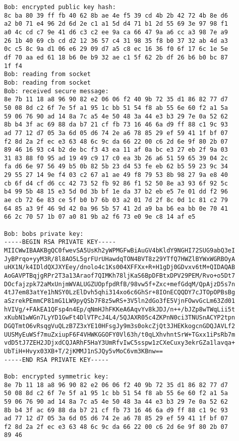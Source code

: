 \documentclass[letterpaper,12pt]{article} \usepackage{fullpage}
\begin{document}
\begin{itemize}
{\begin{verbatim}
Bob: encrypted public key hash: 
8c ba 80 39 ff fb 40 62 8b ae 4e f5 39 cd 4b 2b 42 72 4b 8e d6 
a2 b0 71 e4 96 2d 6d 2e c1 a1 5d d4 71 b1 2d 55 69 3e 97 98 f1 
a0 4c cd c7 9e 41 d6 c3 c2 ee 9a ca 66 47 9a a6 cc a3 98 7e a9 
26 1b 40 69 cb cd d2 12 36 57 c4 31 98 35 f8 b0 37 32 ab 4d a3 
0c c5 8c 9a d1 06 e6 29 09 d7 a5 c8 ec 16 36 f0 6f 17 6c 1e 5e 
df 70 aa ed 61 18 b6 0e b9 32 ae c1 5f 62 2b df 26 b6 b0 bc 87 
1f f4
Bob: reading from socket
Bob: reading from socket
Bob: received secure message: 
8e 7b 11 18 a8 96 90 82 e2 06 06 f2 40 9b 72 35 d1 86 82 77 d7 
50 08 8d c2 6f 7e 5f a1 95 1c bb 51 54 f8 ab 55 6e 60 f2 a1 5a 
59 06 76 90 ad 14 8a 7c a5 4e 50 48 3a 44 e3 b3 29 7e 0a 52 62 
8b b4 3f ac 69 88 da b7 21 cf fb 73 16 46 6a d9 ff 88 c1 9c 93 
ad 77 12 d7 05 3a 6d 05 d6 74 2e a6 78 85 29 ef 59 41 1f bf 07 
f2 8d 2a 2f ec e3 63 48 6c 9c da 66 22 00 c6 2d 6e 9f 80 2b 07 
89 46 16 93 c4 b2 de bc f3 43 ea 11 af 0a bc e3 27 eb 2f 9a 03 
31 83 88 f0 95 ad 19 49 c9 17 c0 ea 3b 26 a6 51 59 65 39 04 2c 
fa d6 6e 97 56 49 b5 0b 82 5b 23 d4 53 fe eb 62 b5 59 23 9c 34 
29 55 27 14 9e f4 03 c2 67 a1 ae 49 f8 79 53 8b 98 27 9a e8 40 
cb 6f d4 cf d6 cc 42 73 52 fb 92 86 f1 52 50 8e a3 93 6f 92 5c 
b4 99 5b 48 15 e3 5d 0d 3b bf 1e da 37 b2 eb e5 7e 01 dd f2 96 
ae cb 72 6e 83 ce 5f b0 b7 6b 03 a2 01 7d 2f 8c 0d 1c 81 c2 79 
64 85 a3 9f 46 9d 42 0a 96 5b 57 41 2d a9 ba b6 ea bb 0e 70 41 
66 2c 70 57 1b 07 a0 81 9b a2 f6 73 e0 9e c8 14 af e5

Bob: bobs private key: 
-----BEGIN RSA PRIVATE KEY-----
MIICWwIBAAKBgQC0fwevSA5UsKh2yWPMGFwBiAuGV4bKldY9NGHI72SUG9abQ3eI
JyBPrqo+yyM3R/8l8AO5L5grFUrUHawdqTON4BVT8z29YTfQ7HWZlBYWxWGRBOyA
uHX1N/k4IDldQXJXYEey/dnolo4c1Ks004XFFXx+R+H1gDj0GDvxv6tM+QIDAQAB
AoGAVPTBqjgRPr2T3a13Araof7QIMKh78ljKaS6BpDFBtxDPV29PEM/Rvo+o5Dt7
DOcfajzpk72aMxUnjmWVALUGZUOpfpdRfB/98vw5f+Zxc+mefGdqM/QpAjzD5s7n
4tJ7em83atYe1hNSY0LzElDvh5qhi314xo6c6GhSr+8IOnECQQDY7cJTOpOPBsBg
aSzrekPEmmCP81mG1LW9pyQSb7F8z5wRS+3V5ln2dGo3fE5VjnFOwvGcLm63Zd01
hVIVg/+FAkEA1QFsp4n4Ep/qNmHJhFKKeA6AqvYv8kJDJ/n++/bJZp8wTWqLii5t
xKubN1wWGn7LyYD1GwFt4DlVTPcJ4L4/5QJAXR05c4ZKPnN0ci3TNUSnACYP2tpn
DGQTmtO6vRsqgVuQLzB7Z3xYE10HFsgJy9m3s0okcZjQt3JHEKkogcnGDQJAVLf2
UUSMyEuWSf7muZxiupF6F4VHWKGGOFY0Vl63h/t0qLXhvhntSrW+TGxx1iPsRb7m
vdD5tJ7ZEH2JDjxdCQJARhF5HaY3UmRfvIwC5sspw1zCXeCuxy3ekrGZa1lavqa+
UbTiH+Hvyx03XB+T/2jKMMJ1nSJQy5vMoC6vm3KBnw==
-----END RSA PRIVATE KEY-----

Bob: encrypted symmetric key: 
8e 7b 11 18 a8 96 90 82 e2 06 06 f2 40 9b 72 35 d1 86 82 77 d7 
50 08 8d c2 6f 7e 5f a1 95 1c bb 51 54 f8 ab 55 6e 60 f2 a1 5a 
59 06 76 90 ad 14 8a 7c a5 4e 50 48 3a 44 e3 b3 29 7e 0a 52 62 
8b b4 3f ac 69 88 da b7 21 cf fb 73 16 46 6a d9 ff 88 c1 9c 93 
ad 77 12 d7 05 3a 6d 05 d6 74 2e a6 78 85 29 ef 59 41 1f bf 07 
f2 8d 2a 2f ec e3 63 48 6c 9c da 66 22 00 c6 2d 6e 9f 80 2b 07 
89 46


\end{verbatim}}
\end{itemize}
\end{document}
